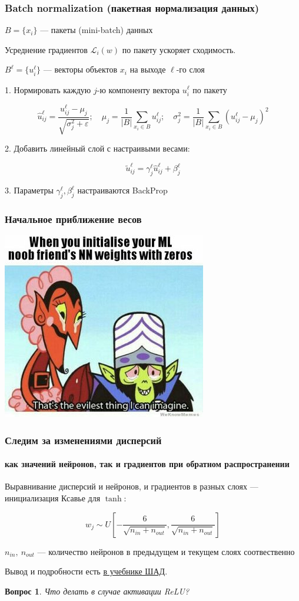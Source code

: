 \documentclass[fullscreen=true, bookmarks=true, hyperref={pdfencoding=unicode}]{beamer}
\newtheorem*{question}{Вопрос}
\begin{document}
\begin{frame}
  \frametitle{Batch normalization (пакетная нормализация данных)}

  $B = \{ x_i\}$ — пакеты (mini-batch) данных

  Усреднение градиентов $\mathcal{L}_i(w)$ по пакету ускоряет сходимость.

  $B^\ell = \{ u_i^\ell\}$ — векторы объектов $x_i$ на выходе $\ell$-го слоя

  1. Нормировать каждую $j$-ю компоненту вектора $u_i^\ell$ по пакету

  $$
    \hat u_{ij}^\ell = \frac{u_{ij}^\ell - \mu_j}{\sqrt{\sigma_j^2 + \varepsilon}}; \quad
    \mu_j = \frac{1}{|B|} \sum\limits_{x_i \in B} u_{ij}^\ell; \quad
    \sigma_j^2 = \frac{1}{|B|} \sum\limits_{x_i \in B} (u_{ij}^\ell - \mu_j)^2
  $$

  2. Добавить линейный слой с настраивыми весами:

  $$ \tilde u_{ij}^\ell = \gamma_j^\ell \hat u_{ij}^\ell + \beta_j^\ell $$

  3. Параметры $\gamma_j^\ell, \beta_j^\ell$ настраиваются BackProp
\end{frame}


\begin{frame}
  \frametitle{Начальное приближение весов}
  \begin{center}
    \includegraphics[keepaspectratio,
                     width=.4\paperwidth]{weight_init_meme.jpg}
  \end{center}
\end{frame}


\begin{frame}
    \frametitle{Следим за изменениями дисперсий}
    \framesubtitle{как значений нейронов, так и градиентов при обратном распространении}
  Выравнивание дисперсий и нейронов, и градиентов в разных слоях — инициализация Ксавье для $\tanh$:

  $$ w_j \sim U \left[ -\frac{{6}}{\sqrt{n_{in}+n_{out}}}, \frac{{6}}{\sqrt{n_{in}+n_{out}}} \right]$$

  $n_{in},\ n_{out}$ — количество нейронов в предыдущем и текущем слоях соотвественно

  Вывод и подробности есть \href{https://ml-handbook.ru/chapters/neural_nets/training}{в учебнике ШАД}.
  \pause
  \begin{question}
  Что делать в случае активации ReLU?
  \end{question}
\end{frame}
\end{document}
